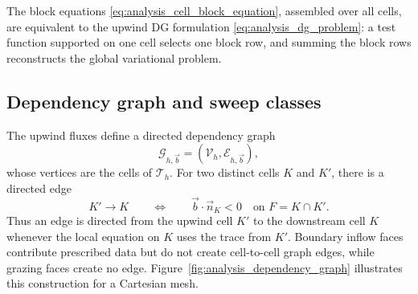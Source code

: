 \documentclass[final]{amsart}
\begin{document}
The block equations \eqref{eq:analysis_cell_block_equation}, assembled
over all cells, are equivalent to the upwind DG formulation
\eqref{eq:analysis_dg_problem}: a test function supported on one cell
selects one block row, and summing the block rows reconstructs the
global variational problem.

\subsection{Dependency graph and sweep classes}
\label{subsec:analysis_sweep_classes}

The upwind fluxes define a directed dependency graph
\begin{equation}
  \mathcal{G}_{h,\vec b}
  =
  (\mathcal{V}_h,\mathcal{E}_{h,\vec b}),
\end{equation}
whose vertices are the cells of $\mathcal{T}_h$. For two distinct cells
$K$ and $K'$, there is a directed edge
\begin{equation}
  K'\to K
  \qquad
  \Longleftrightarrow
  \qquad
  \vec b\cdot\vec n_K<0
  \quad\text{on }F=K\cap K'.
  \label{eq:analysis_graph_edge}
\end{equation}
Thus an edge is directed from the upwind cell $K'$ to the downstream
cell $K$ whenever the local equation on $K$ uses the trace from $K'$.
Boundary inflow faces contribute prescribed data but do not create
cell-to-cell graph edges, while grazing faces create no
edge. Figure~\ref{fig:analysis_dependency_graph} illustrates this
construction for a Cartesian mesh.
\end{document}

